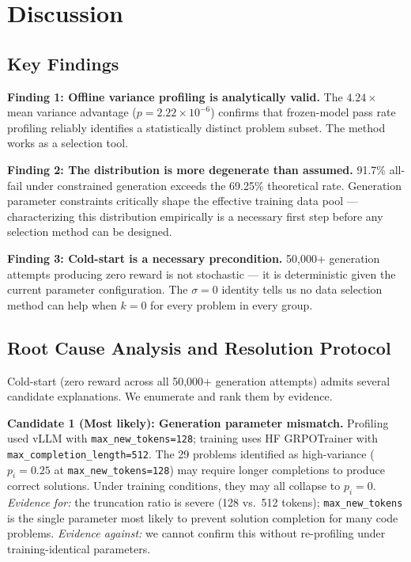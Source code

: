 \section{Discussion}
\label{sec:discussion}

\subsection{Key Findings}

\textbf{Finding 1: Offline variance profiling is analytically valid.} The $4.24\times$ mean variance advantage ($p=2.22\times10^{-6}$) confirms that frozen-model pass rate profiling reliably identifies a statistically distinct problem subset. The method works as a selection tool.

\textbf{Finding 2: The distribution is more degenerate than assumed.} 91.7\% all-fail under constrained generation exceeds the 69.25\% theoretical rate. Generation parameter constraints critically shape the effective training data pool --- characterizing this distribution empirically is a necessary first step before any selection method can be designed.

\textbf{Finding 3: Cold-start is a necessary precondition.} 50,000+ generation attempts producing zero reward is not stochastic --- it is deterministic given the current parameter configuration. The $\sigma=0$ identity tells us no data selection method can help when $k=0$ for every problem in every group.

\subsection{Root Cause Analysis and Resolution Protocol}

Cold-start (zero reward across all 50,000+ generation attempts) admits several candidate explanations. We enumerate and rank them by evidence.

\textbf{Candidate 1 (Most likely): Generation parameter mismatch.} Profiling used vLLM with \texttt{max\_new\_tokens=128}; training uses HF GRPOTrainer with \texttt{max\_completion\_length=512}. The 29 problems identified as high-variance ($p_i=0.25$ at \texttt{max\_new\_tokens=128}) may require longer completions to produce correct solutions. Under training conditions, they may all collapse to $p_i=0$. \textit{Evidence for:} the truncation ratio is severe (128 vs.\ 512 tokens); \texttt{max\_new\_tokens} is the single parameter most likely to prevent solution completion for many code problems. \textit{Evidence against:} we cannot confirm this without re-profiling under training-identical parameters.

